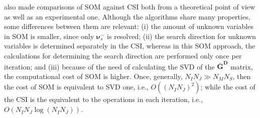 			\cite{chen2010subspace} also made comparisons of SOM against CSI both from a theoretical point of view as well as an experimental one. Although the algorithms share many properties, some differences between them are relevant: (i) the amount of unknown variables in SOM is smaller, since only $\boldsymbol{\nu}^-_s$ is resolved; (ii) the search direction for unknown variables is determined separately in the CSI, whereas in this SOM approach, the calculations for determining the search direction are performed only once per iteration; and (iii) because of the need of calculating the SVD of the $\mathbf{\bar{G}^D}$ matrix, the computational cost of SOM is higher. Once, generally, $N_IN_J \gg N_MN_S$, then the cost of SOM is equivalent to SVD one, i.e., $O((N_IN_J)^2)$; while the cost of the CSI is the equivalent to the operations in each iteration, i.e., $O(N_IN_J\log(N_IN_J))$.
			
